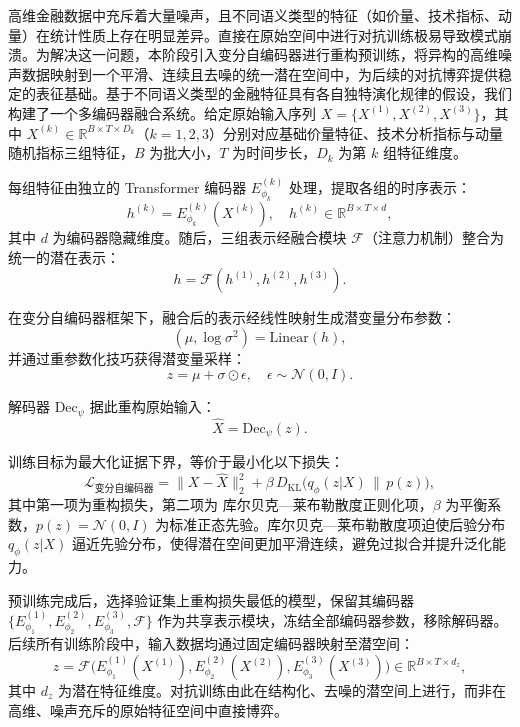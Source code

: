 高维金融数据中充斥着大量噪声，且不同语义类型的特征（如价量、技术指标、动量）在统计性质上存在明显差异。直接在原始空间中进行对抗训练极易导致模式崩溃。为解决这一问题，本阶段引入变分自编码器进行重构预训练，将异构的高维噪声数据映射到一个平滑、连续且去噪的统一潜在空间中，为后续的对抗博弈提供稳定的表征基础。基于不同语义类型的金融特征具有各自独特演化规律的假设，我们构建了一个多编码器融合系统。给定原始输入序列 $X = \{X^{(1)}, X^{(2)}, X^{(3)}\}$，其中 $X^{(k)} \in \mathbb{R}^{B \times T \times D_k}$（$k=1,2,3$）分别对应基础价量特征、技术分析指标与动量随机指标三组特征，$B$ 为批大小，$T$ 为时间步长，$D_k$ 为第 $k$ 组特征维度。

每组特征由独立的 Transformer 编码器 $E^{(k)}_{\phi_k}$ 处理，提取各组的时序表示\cite{vaswani2017attention}：
\begin{equation}
h^{(k)} = E^{(k)}_{\phi_k}(X^{(k)}), \quad h^{(k)} \in \mathbb{R}^{B \times T \times d},
\end{equation}
其中 $d$ 为编码器隐藏维度。随后，三组表示经融合模块 $\mathcal{F}$（注意力机制）整合为统一的潜在表示：
\begin{equation}
h = \mathcal{F}(h^{(1)}, h^{(2)}, h^{(3)}).
\end{equation}

在变分自编码器框架下，融合后的表示经线性映射生成潜变量分布参数：
\begin{equation}
(\mu, \log \sigma^2) = \text{Linear}(h),
\end{equation}
并通过重参数化技巧获得潜变量采样：
\begin{equation}
z = \mu + \sigma \odot \epsilon, \quad \epsilon \sim \mathcal{N}(0, I).
\end{equation}

解码器 $\text{Dec}_{\psi}$ 据此重构原始输入：
\begin{equation}
\hat{X} = \text{Dec}_{\psi}(z).
\end{equation}

训练目标为最大化证据下界，等价于最小化以下损失：
\begin{equation}
\mathcal{L}_{\text{变分自编码器}} = \|X - \hat{X}\|_2^2 + \beta \, D_{\mathrm{KL}}\big(q_\phi(z|X) \,\|\, p(z)\big),
\end{equation}
其中第一项为重构损失，第二项为 库尔贝克—莱布勒散度正则化项，$\beta$ 为平衡系数，$p(z) = \mathcal{N}(0, I)$ 为标准正态先验。库尔贝克—莱布勒散度项迫使后验分布 $q_\phi(z|X)$ 逼近先验分布，使得潜在空间更加平滑连续，避免过拟合并提升泛化能力。

预训练完成后，选择验证集上重构损失最低的模型，保留其编码器 $\{E^{(1)}_{\phi_1}, E^{(2)}_{\phi_2}, E^{(3)}_{\phi_3}, \mathcal{F}\}$ 作为共享表示模块，冻结全部编码器参数，移除解码器。后续所有训练阶段中，输入数据均通过固定编码器映射至潜空间：
\begin{equation}
z = \mathcal{F}\big(E^{(1)}_{\phi_1}(X^{(1)}), E^{(2)}_{\phi_2}(X^{(2)}), E^{(3)}_{\phi_3}(X^{(3)})\big) \in \mathbb{R}^{B \times T \times d_z},
\end{equation}
其中 $d_z$ 为潜在特征维度。对抗训练由此在结构化、去噪的潜空间上进行，而非在高维、噪声充斥的原始特征空间中直接博弈。


